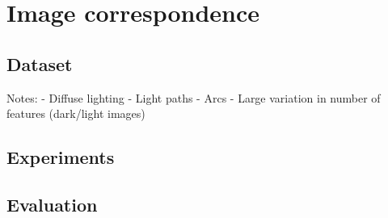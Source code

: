 \documentclass[thesis.tex]{subfiles}
\begin{document}
\chapter{Image correspondence}

\section{Dataset}

Notes:
- Diffuse lighting
- Light paths
- Arcs
- Large variation in number of features (dark/light images)

\cite{aanaes2010recall}
 
\section{Experiments}

\section{Evaluation}


\subbibliography
\end{document}
